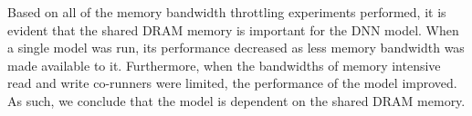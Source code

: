 Based on all of the memory bandwidth throttling experiments 
performed, it is evident that the shared DRAM memory is important for
the DNN model. When a single model was run, its 
performance decreased as less memory bandwidth was 
made available to it. Furthermore, when the bandwidths of memory 
intensive read and write co-runners were limited, the performance of 
the model improved. As such, we conclude that the model is dependent on the 
shared DRAM memory.